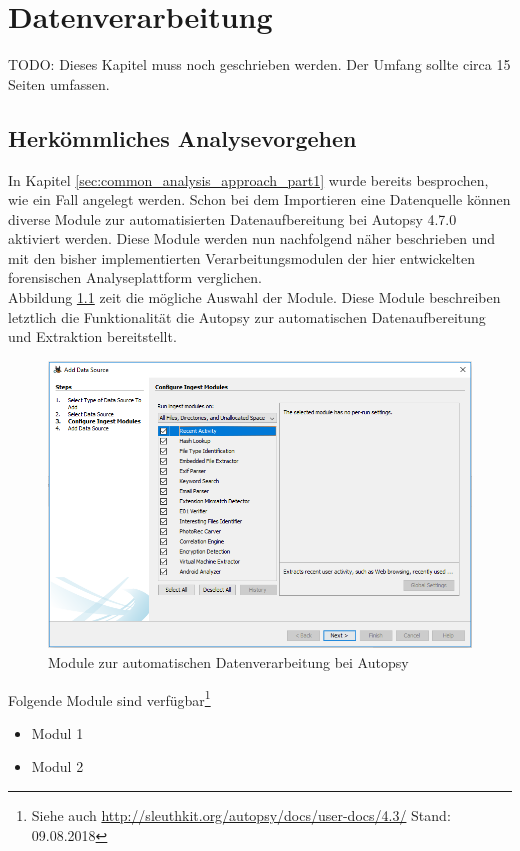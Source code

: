 \chapter{Datenverarbeitung}
\label{ch:data_processing}
TODO: Dieses Kapitel muss noch geschrieben werden. Der Umfang sollte circa 15 Seiten umfassen.

\section{Herkömmliches Analysevorgehen}
\label{sec:common_analysis_approach_part2}

In Kapitel \ref{sec:common_analysis_approach_part1} wurde bereits besprochen, wie ein Fall angelegt werden. Schon bei dem Importieren eine Datenquelle können diverse Module zur automatisierten Datenaufbereitung bei Autopsy 4.7.0 aktiviert werden. Diese Module werden nun nachfolgend näher beschrieben und mit den bisher implementierten Verarbeitungsmodulen der hier entwickelten forensischen Analyseplattform verglichen.\\

Abbildung \ref{fig:autopsy_2_ingest_modules} zeit die mögliche Auswahl der Module.
Diese Module beschreiben letztlich die Funktionalität die Autopsy zur automatischen Datenaufbereitung und Extraktion bereitstellt. 

\begin{figure}[ht]
  \centering
  \includegraphics[width=\textwidth]{./resource/autopsy_2_ingest_modules.png}
  \caption{Module zur automatischen Datenverarbeitung bei Autopsy}
  \label{fig:autopsy_2_ingest_modules}
\end{figure}

Folgende Module sind verfügbar\footnote{Siehe auch \url{http://sleuthkit.org/autopsy/docs/user-docs/4.3/} Stand: 09.08.2018}
\begin{itemize}
\item Modul 1
\item Modul 2
\end{itemize}

